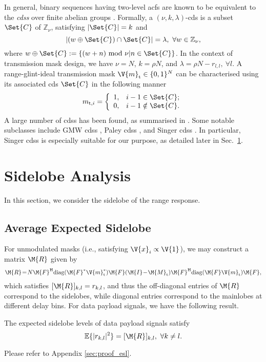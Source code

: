 \documentclass[journal,a4paper,10pt, romanappendices]{IEEEtran}
\begin{document}
In general, binary sequences having two-level \ac{acf}s are known to be equivalent to the \emph{\acp{cds}} over finite abelian groups \cite{cds}. Formally, a $(\nu,k,\lambda)$-\ac{cds} is a subset $\Set{C}$ of $\mathbb{Z}_\nu$,  satisfying $|\Set{C}|=k$ and
$$
|(w\oplus\Set{C})\cap \Set{C}|=\lambda,~\forall w\in\mathbb{Z}_\nu,
$$
where $w\oplus\Set{C}:=\{(w+n)~{\rm mod}~\nu|n\in\Set{C}\}$. In the context of transmission mask design, we have $\nu = N$, $k=\rho N$, and $\lambda = \rho N - r_{l,l},~\forall l$. A range-glint-ideal transmission mask $\V{m}_{\rm t}\in\{0,1\}^N$ can be characterised using its associated \ac{cds} $\Set{C}$ in the following manner
\begin{equation}
m_{{\rm t},i} = \left\{
  \begin{array}{ll}
    1, & \hbox{$i-1\in\Set{C}$;} \\
    0, & \hbox{$i-1\notin \Set{C}$.}
  \end{array}
\right.
\end{equation}
A large number of \acp{cds} has been found, as summarised in \cite{lajolla}. Some notable subclasses include GMW \acp{cds} \cite{gmw_sequence}, Paley \acp{cds} \cite{paley_pds}, and Singer \acp{cds} \cite{singer1938theorem}. In particular, Singer \acp{cds} is especially suitable for our purpose, as detailed later in Sec.~\ref{sec:sidelobe}.

\section{Sidelobe Analysis}\label{sec:sidelobe}
In this section, we consider the sidelobe of the range response. 

\subsection{Average Expected Sidelobe}
For unmodulated masks (i.e., satisfying $\V{x}_i \propto \V{1}$), we may construct a matrix $\M{R}$ given by
\begin{equation}
\M{R} \!=\! N\M{F}^{\rm H}{\rm diag}(\M{F}^*\V{m}_{\rm t}^*)\M{F}(\M{I}\!-\!\M{M}_{\rm t})\M{F}^{\rm H}{\rm diag}(\M{F}\V{m}_{\rm t})\M{F},
\end{equation}
which satisfies $[\M{R}]_{k,l} = r_{k,l}$, and thus the off-diagonal entries of $\M{R}$ correspond to the sidelobes, while diagonal entries correspond to the mainlobes at different delay bins. For data payload signals, we have the following result.
\begin{proposition}\label{prop:esl}
The expected sidelobe levels of data payload signals satisfy
\begin{equation}\label{esl}
\mathbb{E}\{|r_{k,l}|^2\} =[\M{R}]_{k,l},~\forall k\neq l.
\end{equation}
\begin{IEEEproof}
Please refer to Appendix \ref{sec:proof_esl}.
\end{IEEEproof}
\end{proposition}
\end{document}
